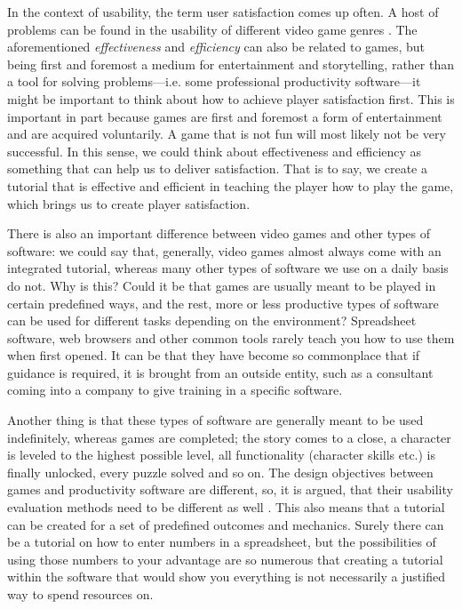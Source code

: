 In the context of usability, the term user satisfaction comes up often. A host of problems can be found in the usability of different video game genres \cite{Pinelle2008b}. The aforementioned \textit{effectiveness} and \textit{efficiency} can also be related to games, but being first and foremost a medium for entertainment and storytelling, rather than a tool for solving problems---i.e. some professional productivity software---it might be important to think about how to achieve player satisfaction first. This is important in part because games are first and foremost a form of entertainment and are acquired voluntarily. A game that is not fun will most likely not be very successful. \cite{Federoff2002} In this sense, we could think about effectiveness and efficiency as something that can help us to deliver satisfaction. That is to say, we create a tutorial that is effective and efficient in teaching the player how to play the game, which brings us to create player satisfaction.

There is also an important difference between video games and other types of software: we could say that, generally, video games almost always come with an integrated tutorial, whereas many other types of software we use on a daily basis do not. Why is this? Could it be that games are usually meant to be played in certain predefined ways, and the rest, more or less productive types of software can be used for different tasks depending on the environment? Spreadsheet software, web browsers and other common tools rarely teach you how to use them when first opened. It can be that they have become so commonplace that if guidance is required, it is brought from an outside entity, such as a consultant coming into a company to give training in a specific software. 

Another thing is that these types of software are generally meant to be used indefinitely, whereas games are completed; the story comes to a close, a character is leveled to the highest possible level, all functionality (character skills etc.) is finally unlocked, every puzzle solved and so on. The design objectives between games and productivity software are different, so, it is argued, that their usability evaluation methods need to be different as well \cite{Korhonen2009}. This also means that a tutorial can be created for a set of predefined outcomes and mechanics. Surely there can be a tutorial on how to enter numbers in a spreadsheet, but the possibilities of using those numbers to your advantage are so numerous that creating a tutorial within the software that would show you everything is not necessarily a justified way to spend resources on.

